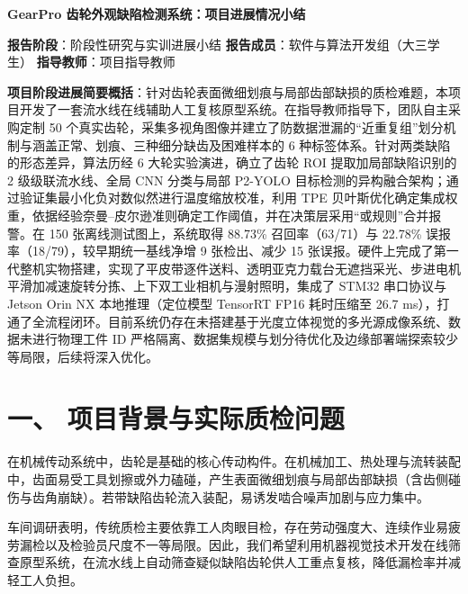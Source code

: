 
\begin{center}
{\bfseries GearPro 齿轮外观缺陷检测系统：项目进展情况小结\par}
\end{center}

\vspace{0.6em}
\noindent\textbf{报告阶段}：阶段性研究与实训进展小结 \hfill
\textbf{报告成员}：软件与算法开发组（大三学生） \hfill
\textbf{指导教师}：项目指导教师 \par
\vspace{0.8em}

\textbf{项目阶段进展简要概括}：针对齿轮表面微细划痕与局部齿部缺损的质检难题，本项目开发了一套流水线在线辅助人工复核原型系统。在指导教师指导下，团队自主采购定制 50 个真实齿轮，采集多视角图像并建立了防数据泄漏的“近重复组”划分机制与涵盖正常、划痕、三种细分缺齿及困难样本的 6 种标签体系。针对两类缺陷的形态差异，算法历经 6 大轮实验演进，确立了齿轮 ROI 提取加局部缺陷识别的 2 级级联流水线、全局 CNN 分类与局部 P2-YOLO 目标检测的异构融合架构；通过验证集最小化负对数似然进行温度缩放校准，利用 TPE 贝叶斯优化确定集成权重，依据经验奈曼–皮尔逊准则确定工作阈值，并在决策层采用“或规则”合并报警。在 150 张离线测试图上，系统取得 88.73\% 召回率（63/71）与 22.78\% 误报率（18/79），较早期统一基线净增 9 张检出、减少 15 张误报。硬件上完成了第一代整机实物搭建，实现了平皮带逐件送料、透明亚克力载台无遮挡采光、步进电机平滑加减速旋转分拣、上下双工业相机与漫射照明，集成了 STM32 串口协议与 Jetson Orin NX 本地推理（定位模型 TensorRT FP16 耗时压缩至 26.7 ms），打通了全流程闭环。目前系统仍存在未搭建基于光度立体视觉的多光源成像系统、数据未进行物理工件 ID 严格隔离、数据集规模与划分待优化及边缘部署端探索较少等局限，后续将深入优化。

\section*{一、 项目背景与实际质检问题}

在机械传动系统中，齿轮是基础的核心传动构件。在机械加工、热处理与流转装配中，齿面易受工具划擦或外力磕碰，产生表面微细划痕与局部齿部缺损（含齿侧碰伤与齿角崩缺）。若带缺陷齿轮流入装配，易诱发啮合噪声加剧与应力集中。

车间调研表明，传统质检主要依靠工人肉眼目检，存在劳动强度大、连续作业易疲劳漏检以及检验员尺度不一等局限。因此，我们希望利用机器视觉技术开发在线筛查原型系统，在流水线上自动筛查疑似缺陷齿轮供人工重点复核，降低漏检率并减轻工人负担。


